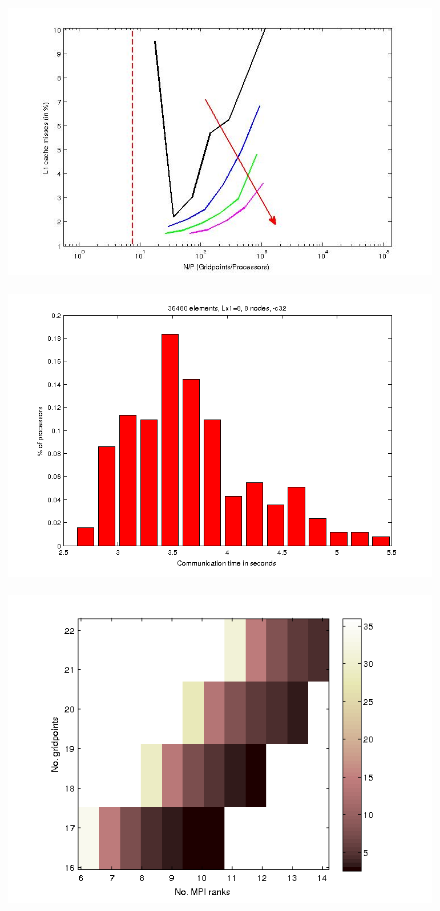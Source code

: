 \documentclass{sig-alternate}
\begin{document}
\begin{figure}
  \centering
  \includegraphics[width=\linewidth]{./figures/cachelines.jpg}
\end{figure}
\begin{figure}
  \centering
  \includegraphics[width=\linewidth]{./figures/loadbalance.png}
\end{figure}
\begin{figure}
  \centering
  \includegraphics[width=\linewidth]{./figures/weak.png}
\end{figure}
\end{document}
